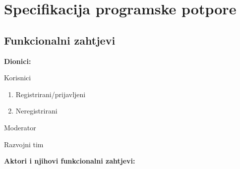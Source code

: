 \chapter{Specifikacija programske potpore}

\section{Funkcionalni zahtjevi}

\noindent \textbf{Dionici:}

\begin{packed_enum}

	\item Korisnici
	\begin{enumerate}
		\item Registrirani/prijavljeni
		\item Neregistrirani
	\end{enumerate}
	\item Moderator
	\item Razvojni tim

\end{packed_enum}



\noindent \textbf{Aktori i njihovi funkcionalni zahtjevi:}


